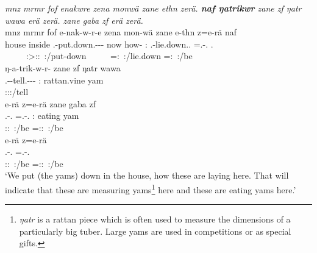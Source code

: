 \begin{exe}
	\ex \emph{mnz mrmr fof enakwre zena monwä zane ethn zerä. \textbf{naf ŋatrikwr} zane zf ŋatr wawa erä zerä. zane gaba zf erä zerä.}\\
	\glll mnz mrmr fof e-nak-w-r-e zena mon-wä zane e-thn z=e-rä naf\\
	house inside \Emph{} \Stnsg.\Alph-put.down.\Ext-\Ndu-\Lk-\Fnsg{} now how-\Emph{} \Dem:\Prox{} \Stnsg.\Alph-lie.down.\Ext.\Ndu{} \Prox=\Stnsg.\Alph-\Cop.\Ndu{} \Tsg.\Erg{}\\
	~ ~ ~ {\Fpl:\Sbj>\Stpl:\Obj:\Nonpast~:\Ipfv/put-down} ~ ~ ~ {\Prox=\Stpl:\Nonpast~:\Ipfv/lie.down} \footnotesize{\Prox=\Stpl:\Nonpast~:\Ipfv/be} ~\\
	\sn
	\glll ŋ-a-trik-w-r-\Zero{} zane zf ŋatr wawa\\
	\M.\Alph-\Vc-tell.\Ext-\Ndu-\Lk-\Stsg{} \Dem:\Prox{} \Imm{} rattan.vine yam\\
	\footnotesize{\Stsg:\Sbj:\Nonpast:\Ipfv/tell} ~ ~ ~ ~\\
	\sn
	\glll e-rä z=e-rä zane gaba zf\\
	\Stnsg.\Alph-\Cop.\Ndu{} \Prox=\Stnsg.\Alph-\Cop.\Ndu{} \Dem:\Prox{} {eating yam} \Imm{}\\
	\footnotesize{\Stpl:\Sbj:\Nonpast~:\Ipfv/be} \footnotesize{\Prox=\Stpl:\Sbj:\Nonpast~:\Ipfv/be} ~ ~ ~\\
	\sn
	\glll e-rä z=e-rä\\
	\Stnsg.\Alph-\Cop.\Ndu{} \Prox=\Stnsg.\Alph-\Cop.\Ndu{}\\
	\footnotesize{\Stpl:\Sbj:\Nonpast~:\Ipfv/be} \footnotesize{\Prox=\Stpl:\Sbj:\Nonpast~:\Ipfv/be}\\
	\trans `We put (the yams) down in the house, how these are laying here. That will indicate that these are measuring yams\footnote{\emph{ŋatr} is a rattan piece which is often used to measure the dimensions of a particularly big tuber. Large yams are used in competitions or as special gifts.} here and these are eating yams here.'\\ 
	\label{ex167}
\end{exe}

